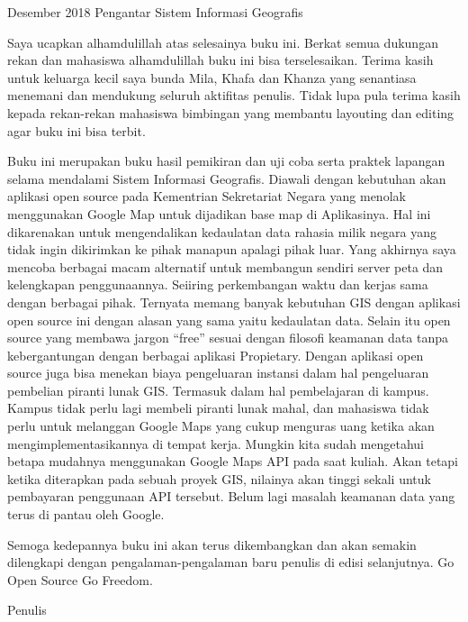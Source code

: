 \documentclass{WileySix}
\begin{document}
\subtitle{Sejarah, Definisi dan Konsep Dasar}

\author{Rolly Maulana Awangga}

\halftitlepage
\titlepage



\begin{copyrightpage}{Desember 2018}
Pengantar Sistem Informasi Geografis
\end{copyrightpage}


\dedication{For my family Bunda, Khafayah dan Khanza}


\begin{preface}
	Saya ucapkan alhamdulillah atas selesainya buku ini. Berkat semua dukungan rekan dan mahasiswa alhamdulillah buku ini bisa terselesaikan. Terima kasih untuk keluarga kecil saya bunda Mila, Khafa dan Khanza yang senantiasa menemani dan mendukung seluruh aktifitas penulis. Tidak lupa pula terima kasih kepada rekan-rekan mahasiswa bimbingan yang membantu layouting dan editing agar buku ini bisa terbit.

	Buku ini merupakan buku hasil pemikiran dan uji coba serta praktek lapangan selama mendalami Sistem Informasi Geografis. Diawali dengan kebutuhan akan aplikasi open source pada Kementrian Sekretariat Negara yang menolak menggunakan Google Map untuk dijadikan base map di Aplikasinya. Hal ini dikarenakan untuk mengendalikan kedaulatan data rahasia milik negara yang tidak ingin dikirimkan ke pihak manapun apalagi pihak luar. Yang akhirnya saya mencoba berbagai macam alternatif untuk membangun sendiri server peta dan kelengkapan penggunaannya. Seiiring perkembangan waktu dan kerjas sama dengan berbagai pihak. Ternyata memang banyak kebutuhan GIS dengan aplikasi open source ini dengan alasan yang sama yaitu kedaulatan data. Selain itu open source yang membawa jargon “free” sesuai dengan filosofi keamanan data tanpa kebergantungan dengan berbagai aplikasi Propietary. Dengan aplikasi open source juga bisa menekan biaya pengeluaran instansi dalam hal pengeluaran pembelian piranti lunak GIS. Termasuk dalam hal pembelajaran di kampus. Kampus tidak perlu lagi membeli piranti lunak mahal, dan mahasiswa tidak perlu untuk melanggan Google Maps yang cukup menguras uang ketika akan mengimplementasikannya di tempat kerja. Mungkin kita sudah mengetahui betapa mudahnya menggunakan Google Maps API pada saat kuliah. Akan tetapi ketika diterapkan pada sebuah proyek GIS, nilainya akan tinggi sekali untuk pembayaran penggunaan API tersebut. Belum lagi masalah keamanan data yang terus di pantau oleh Google.

	Semoga kedepannya buku ini akan terus dikembangkan dan akan semakin dilengkapi dengan pengalaman-pengalaman baru penulis di edisi selanjutnya. Go Open Source Go Freedom.

Penulis	
\end{preface}
\end{document}
